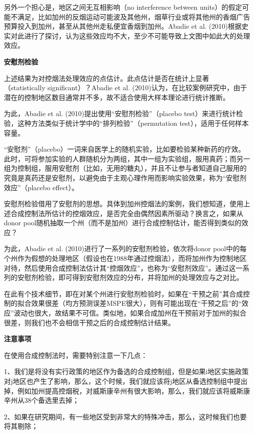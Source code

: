 \documentclass[cn,12pt,math=newtx,citestyle=gb7714-2015,bibstyle=gb7714-2015]{elegantbook}
\begin{document}
	另外一个担心是，地区之间无互相影响（no interference between units）的假定可能不满足，比如加州的反烟运动可能波及其他州，烟草行业或将其他州的香烟广告预算投入到加州，甚至从其他州走私便宜香烟到加州。Abadie et al. (2010)根据史实对此进行了探讨，认为这些效应均不大，至少不可能导致上文图中如此大的处理效应。
	
	\textbf{安慰剂检验}
	
	上述结果为对控烟法处理效应的点估计。此点估计是否在统计上显著（statistically significant）？Abadie et al. (2010)认为，在比较案例研究中，由于潜在的控制地区数目通常并不多，故不适合使用大样本理论进行统计推断。
	
	为此，Abadie et al. (2010)提出使用“安慰剂检验”（placebo test）来进行统计检验，这种方法类似于统计学中的“排列检验”（permutation test），适用于任何样本容量。
	
	“安慰剂”（placebo）一词来自医学上的随机实验，比如要检验某种新药的疗效。此时，可将参加实验的人群随机分为两组，其中一组为实验组，服用真药；而另一组为控制组，服用安慰剂（比如，无用的糖丸），并且不让参与者知道自己服用的究竟是真药还是安慰剂，以避免由于主观心理作用而影响实验效果，称为“安慰剂效应”（placebo effect）。
	
	安慰剂检验借用了安慰剂的思想。具体到加州控烟法的案例，我们想知道，使用上述合成控制法所估计的控烟效应，是否完全由偶然因素所驱动？换言之，如果从donor pool随机抽取一个州（而不是加州）进行合成控制估计，能否得到类似的效应？
	
	为此，Abadie et al. (2010)进行了一系列的安慰剂检验，依次将donor pool中的每个州作为假想的处理地区（假设也在1988年通过控烟法），而将加州作为控制地区对待，然后使用合成控制法估计其“控烟效应”，也称为“安慰剂效应”。通过这一系列的安慰剂检验，即可得到安慰剂效应的分布，并将加州的处理效应与之对比。
	
	在此有个技术细节，即在对某个州进行安慰剂检验时，如果在“干预之前”其合成控制的拟合效果很差（均方预测误差MSPE很大），则有可能出现在“干预之后”的“效应”波动也很大，故结果不可信。类似地，如果合成加州在干预前对于加州的拟合很差，则我们也不会相信干预之后的合成控制估计结果。
	
	\textbf{注意事项}
	
	在使用合成控制法时，需要特别注意一下几点：
	
	1、我们是将没有实行政策的地区作为备选的合成控制组，但是如果i地区实施政策对j地区也产生了影响，那么，这个时候，我们就应该将j地区从备选控制组中提出掉，例如加州提高控烟税，对威斯康辛州有很大影响，那么，我们就应该将威斯康辛州从38个备选里去掉；
	
	2、如果在研究期间，有一些地区受到非常大的特殊冲击，那么，这时候我们也要将其剔除；
	
\end{document}
